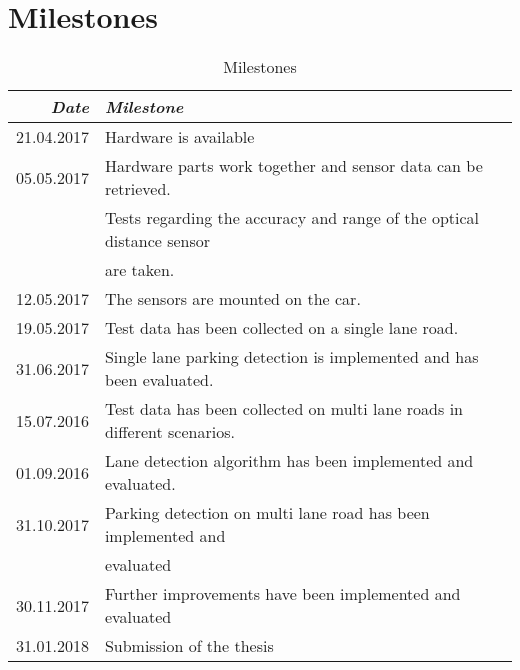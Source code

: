 \documentclass[11pt,a4paper,titlepage,
chapterprefix,headsepline,parskip,pdftex,
,pointlessnumbers,bibtotoc]{article}
\begin{document}
\newpage

\section{Milestones}


\begin{table}[h]
\centering
\begin{tabular}{r|l}
\emph{Date} & \emph{Milestone} \\\hline
21.04.2017 & Hardware is available \\
05.05.2017 & Hardware parts work together and sensor data can be retrieved. \\
 & Tests regarding the accuracy and range of the optical distance sensor \\
 & are taken. \\
12.05.2017 & The sensors are mounted on the car. \\
19.05.2017 & Test data has been collected on a single lane road. \\
31.06.2017 & Single lane parking detection is implemented and has been evaluated. \\
15.07.2016 & Test data has been collected on multi lane roads in different scenarios. \\
01.09.2016 & Lane detection algorithm has been implemented and evaluated. \\
31.10.2017 & Parking detection on multi lane road has been implemented and \\
 & evaluated \\
30.11.2017 & Further improvements have been implemented and evaluated \\
31.01.2018 & Submission of the thesis
\end{tabular}
\caption{\label{tab:milestones} Milestones}
\end{table}


%

% 



%
\end{document}
